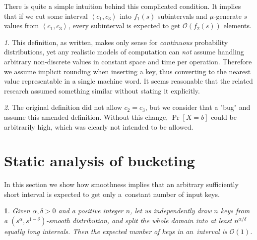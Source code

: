 \documentclass[
submission
]{dmtcs-episciences}
\theoremstyle{plain}
\theoremstyle{definition}
\theoremstyle{remark}
\newtheorem*{rem*}{\protect\remarkname}
\theoremstyle{plain}
\newtheorem*{lem*}{\protect\lemmaname}
\theoremstyle{plain}
\newcounter{lemma}
\providecommand{\lemmaname}{Lemma}
\providecommand{\remarkname}{Remark}
\def\interval#1#2{\left\langle#1,#2\right\rangle}
\def\Prob#1{\Pr\!\left[#1\right]}
\def\OO{\mathcal O}
\begin{document}
There is quite a simple intuition behind this complicated condition. It implies that if we cut some interval $\interval{c_1}{c_3}$ into $f_1(s)$ subintervals and $\mu$-generate $s$ values from $\interval{c_1}{c_3}$, every subinterval is expected to get $\OO(f_2(s))$ elements.

\begin{rem*}
This definition, as written, makes only sense for \emph{continuous} probability
distributions, yet any realistic models of computation can
\emph{not} assume handling arbitrary non-discrete values in constant
space and time per operation. Therefore we assume implicit rounding
when inserting a key, thus converting to the nearest value representable
in a single machine word. It seems reasonable that the related research
assumed something similar without stating it explicitly.
\end{rem*}

\begin{rem*}
The original definition did not allow $c_2 = c_3$, but we consider that a "bug" and assume this amended definition.
Without this change, $\Prob{X = b}$ could be arbitrarily high, which was clearly not intended to be allowed.
\end{rem*}


\section{Static analysis of bucketing}
 \label{sec:smooth-bucket}
In this section we show how smoothness implies that an arbitrary sufficiently
short interval is expected to get only a~constant number of input keys.
\begin{lem*}
\label{lem:smooth-bucket}
Given $\alpha,\delta>0$ and a positive
integer $n$, let us independently draw $n$ keys from a $\left(s^{\alpha},s^{1-\delta}\right)$-smooth
distribution, and split the whole domain into at least $n^{\alpha/\delta}$
equally long intervals. Then the expected number of keys in an~interval
is $\OO(1)$.
\end{lem*}
\end{document}
